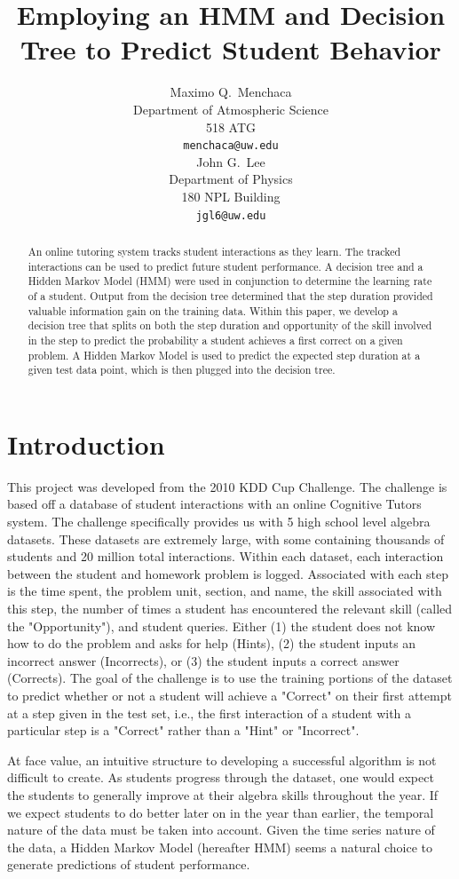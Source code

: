 \documentclass{article} %
\title{Employing an HMM and Decision Tree to Predict Student Behavior}
\author{
Maximo Q.~Menchaca\\
Department of Atmospheric Science\\
518 ATG\\
\texttt{menchaca@uw.edu} \\
\And
John G.~Lee\\
Department of Physics \\
180 NPL Building \\
\texttt{jgl6@uw.edu} \\
}
\begin{document}
\maketitle

\begin{abstract}
An online tutoring system tracks student interactions as they learn. The tracked interactions can be used to predict future student performance. A decision tree and a Hidden Markov Model (HMM) were used in conjunction to determine the learning rate of a student. Output from the decision tree determined that the step duration provided valuable information gain on the training data. Within this paper, we develop a decision tree that splits on both the step duration and opportunity of the skill involved in the step to predict the probability a student achieves a first correct on a given problem. A Hidden Markov Model is used to predict the expected step duration at a given test data point, which is then plugged into the decision tree.
\end{abstract}

\section{Introduction}
This project was developed from the 2010 KDD Cup Challenge. The challenge is based off a database of student interactions with an online Cognitive Tutors system. The challenge specifically provides us with 5 high school level algebra datasets. These datasets are extremely large, with some containing thousands of students and 20 million total interactions. Within each dataset, each interaction between the student and homework problem is logged. Associated with each step is the time spent, the problem unit, section, and name, the skill associated with this step, the number of times a student has encountered the relevant skill (called the "Opportunity"), and student queries. Either (1) the student does not know how to do the problem and asks for help (Hints), (2) the student inputs an incorrect answer (Incorrects), or (3) the student inputs a correct answer (Corrects). The goal of the challenge is to use the training portions of the dataset to predict whether or not a student will achieve a "Correct" on their first attempt at a step given in the test set, i.e., the first interaction of a student with a particular step is a "Correct" rather than a "Hint" or "Incorrect".

At face value, an intuitive structure to developing a successful algorithm is not difficult to create. As students progress through the dataset, one would expect the students to generally improve at their algebra skills throughout the year. If we expect students to do better later on in the year than earlier, the temporal nature of the data must be taken into account. Given the time series nature of the data, a Hidden Markov Model (hereafter HMM) seems a natural choice to generate predictions of student performance.
\end{document}
